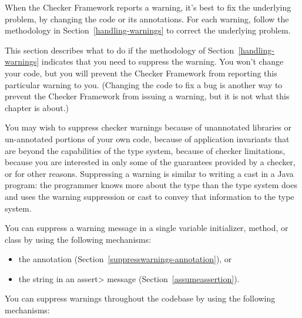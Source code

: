 \htmlhr
{}


When the Checker Framework reports a warning, it's best to fix the
underlying problem, by changing the code or its annotations.  For each
warning, follow the methodology in Section~\ref{handling-warnings} to
correct the underlying problem.

This section describes what to do if the methodology of
Section~\ref{handling-warnings} indicates that you need to suppress the
warning.  You won't change your code, but you will prevent the Checker
Framework from reporting this particular warning to you.  (Changing the
code to fix a bug is another way to prevent the Checker Framework from
issuing a warning, but it is not what this chapter is about.)

You may wish to suppress checker warnings because of unannotated libraries
or un-annotated portions of your own code, because of application
invariants that are beyond the capabilities of the type system, because of
checker limitations, because you are interested in only some of the
guarantees provided by a checker, or for other reasons.
Suppressing a warning is similar to writing a cast in a Java
program:  the programmer knows more about the type than the type system does
and uses the warning suppression or cast to convey that information to the
type system.

You can suppress a warning message in a single variable initializer,
method, or class by using the following mechanisms:

\begin{itemize}
\item
  the  annotation
  (Section~\ref{suppresswarnings-annotation}), or
\item
  the  string in an \<assert> message (Section~\ref{assumeassertion}).
\end{itemize}

You can suppress warnings throughout the codebase by using the following mechanisms:

